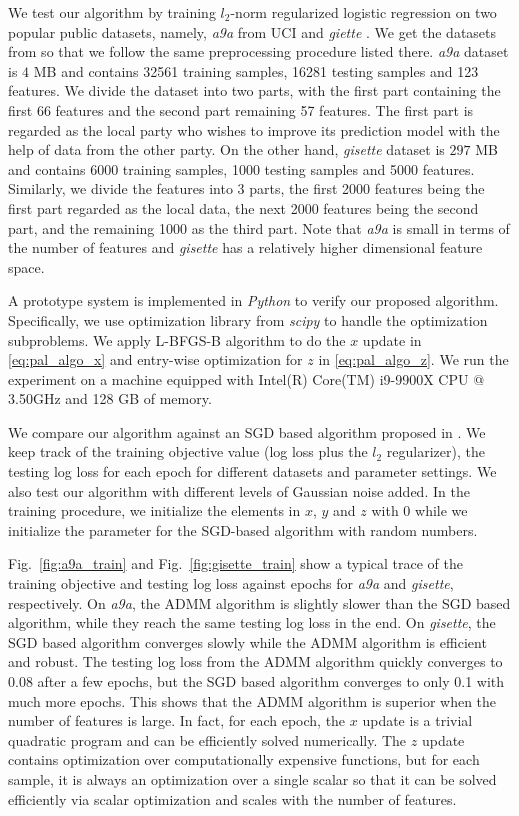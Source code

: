 We test our algorithm by training $l_2$-norm regularized logistic regression on two popular public datasets, namely, \emph{a9a} from UCI \cite{Dua:2019} and \emph{giette} \cite{guyon2005result}. We get the datasets from \cite{Liblinear:2019} so that we follow the same preprocessing procedure listed there. \emph{a9a} dataset is $4$ MB and contains 32561 training samples, 16281 testing samples and 123 features. We divide the dataset into two parts, with the first part containing the first 66 features and the second part remaining 57 features. The first part is regarded as the local party who wishes to improve its prediction model with the help of data from the other party. On the other hand, \emph{gisette} dataset is $297$ MB and contains 6000 training samples, 1000 testing samples and 5000 features. Similarly, we divide the features into 3 parts, the first 2000 features being the first part regarded as the local data, the next 2000 features being the second part, and the remaining 1000 as the third part. Note that \emph{a9a} is small in terms of the number of features and \emph{gisette} has a relatively higher dimensional feature space.

A prototype system is implemented in \emph{Python} to verify our proposed algorithm. Specifically, we use optimization library from \emph{scipy} to handle the optimization subproblems. We apply L-BFGS-B algorithm to do the $x$ update in \eqref{eq:pal_algo_x} and entry-wise optimization for $z$ in \eqref{eq:pal_algo_z}. We run the experiment on a machine equipped with Intel(R) Core(TM) i9-9900X CPU @ 3.50GHz and 128 GB of memory. 

We compare our algorithm against an SGD based algorithm proposed in \cite{hu2019fdml}.
We keep track of the training objective value (log loss plus the $l_2$ regularizer), the testing log loss for each epoch for different datasets and parameter settings. We also test our algorithm with different levels of Gaussian noise added. In the training procedure, we initialize the elements in $x$, $y$ and $z$ with $0$ while we initialize the parameter for the SGD-based algorithm with random numbers.

Fig.~\ref{fig:a9a_train} and Fig.~\ref{fig:gisette_train} show a typical trace of the training objective and testing log loss against epochs for \emph{a9a} and \emph{gisette}, respectively. On \emph{a9a}, the ADMM algorithm is slightly slower than the SGD based algorithm, while they reach the same testing log loss in the end. On \emph{gisette}, the SGD based algorithm converges slowly while the ADMM algorithm is efficient and robust. The testing log loss from the ADMM algorithm quickly converges to 0.08 after a few epochs, but the SGD based algorithm converges to only 0.1 with much more epochs. This shows that the ADMM algorithm is superior when the number of features is large.
In fact, for each epoch, the $x$ update is a trivial quadratic program and can be efficiently solved numerically. The $z$ update contains optimization over computationally expensive functions, but for each sample, it is always an optimization over a single scalar so that it can be solved efficiently via scalar optimization and scales with the number of features. 

